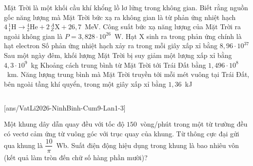 	\begin{ex}%
		Mặt Trời là một khối cầu khí khổng lồ lơ lửng trong không gian. Biết rằng nguồn gốc năng lượng mà Mặt Trời bức xạ ra không gian là từ phản ứng nhiệt hạch $4\,{}^1_1\text{H}\to{}^4_2\text{He}+2\,{}^A_Z\text{X}+26{,}7$~MeV. Công suất bức xạ năng lượng của Mặt Trời ra ngoài không gian là $P=3{,}828\cdot 10^{26}$~W.
		\choiceTFt
		{Hạt X sinh ra trong phản ứng chính là hạt electron}
		{\True Số phản ứng nhiệt hạch xảy ra trong mỗi giây xấp xỉ bằng $8{,}96\cdot 10^{37}$}
		{Sau một ngày đêm, khối lượng Mặt Trời bị suy giảm một lượng xấp xỉ bằng $4{,}3\cdot 10^9$~kg}
		{\True Khoảng cách trung bình từ Mặt Trời tới Trái Đất bằng $1{,}496\cdot 10^8$~km. Năng lượng trung bình mà Mặt Trời truyền tới mỗi mét vuông tại Trái Đất, bên ngoài tầng khí quyển, trong một giây xấp xỉ bằng $1{,}36$~kJ}
	\end{ex}

	\subsection*{}
	\setcounter{ex}{0}
	[ans/VatLi2026-NinhBinh-Cum9-Lan1-3]

	\begin{ex}%
		Một khung dây dẫn quay đều với tốc độ $150$~vòng/phút trong một từ trường đều có vectơ cảm ứng từ vuông góc với trục quay của khung. Từ thông cực đại gửi qua khung là $\dfrac{10}{\pi}$~Wb. Suất điện động hiệu dụng trong khung là bao nhiêu vôn (kết quả làm tròn đến chữ số hàng phần mười)?
		\par
	\end{ex}

